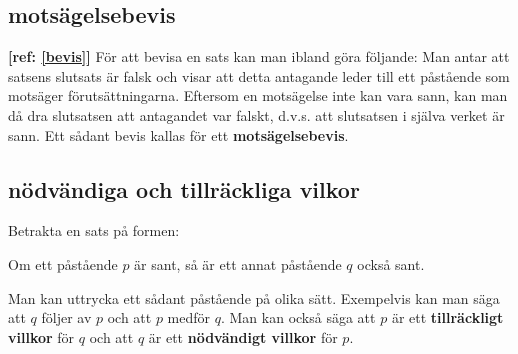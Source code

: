 \subsection{motsägelsebevis}
    \label{motsägelsebevis}
    \textbf{[ref: \ref{bevis}]} För att bevisa en sats kan man ibland göra följande: Man antar att satsens slutsats är falsk och visar att detta antagande leder till ett påstående som motsäger förutsättningarna. Eftersom en motsägelse inte kan vara sann, kan man då dra slutsatsen att antagandet var falskt, d.v.s. att slutsatsen i själva verket är sann. Ett sådant bevis kallas för ett \textbf{motsägelsebevis}.
\subsection{nödvändiga och tillräckliga vilkor}
    \label{nödvändiga-och-tillräckliga-vilkor}
    \textbf{\cite{nödvändiga-och-tillräckliga-vilkor}} Betrakta en sats på formen:
    \begin{center}
        Om ett påstående $p$ är sant, så är ett annat påstående $q$ också sant.
    \end{center}
    Man kan uttrycka ett sådant påstående på olika sätt. Exempelvis kan man säga att $q$ följer av $p$ och att $p$ medför $q$. Man kan också säga att $p$ är ett \textbf{tillräckligt villkor} för $q$ och att $q$ är ett \textbf{nödvändigt villkor} för $p$. 